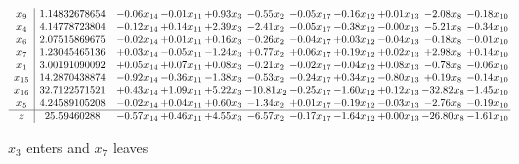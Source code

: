 \documentclass[9pt]{article}
\begin{document}
 \[\begin{array}{c| c c@{\hskip 2pt} c@{\hskip 2pt} c@{\hskip 2pt} c@{\hskip 2pt} c@{\hskip 2pt} c@{\hskip 2pt} c@{\hskip 2pt} c@{\hskip 2pt} c@{\hskip 2pt} }
 x_{9}   &  1.14832678654 & -0.06 x_{14} & -0.01 x_{11} & +  0.93 x_{3} & -0.55 x_{2} & -0.05 x_{17} & -0.16 x_{12} & +  0.01 x_{13} & -2.08 x_{8} & -0.18 x_{10}\\
 x_{4}   &  4.14778723804 & -0.12 x_{14} & +  0.14 x_{11} & +  2.39 x_{3} & -2.41 x_{2} & -0.05 x_{17} & -0.38 x_{12} & -0.00 x_{13} & -5.21 x_{8} & -0.34 x_{10}\\
 x_{6}   &  2.07515869675 & -0.02 x_{14} & +  0.01 x_{11} & +  0.16 x_{3} & -0.26 x_{2} & -0.04 x_{17} & +  0.03 x_{12} & -0.04 x_{13} & -0.18 x_{8} & -0.01 x_{10}\\
 x_{7}   &  1.23045465136 & +  0.03 x_{14} & -0.05 x_{11} & -1.24 x_{3} & +  0.77 x_{2} & +  0.06 x_{17} & +  0.19 x_{12} & +  0.02 x_{13} & +  2.98 x_{8} & +  0.14 x_{10}\\
 x_{1}   &  3.00191090092 & +  0.05 x_{14} & +  0.07 x_{11} & +  0.08 x_{3} & -0.21 x_{2} & -0.02 x_{17} & -0.04 x_{12} & +  0.08 x_{13} & -0.78 x_{8} & -0.06 x_{10}\\
 x_{15}   &  14.2870438874 & -0.92 x_{14} & -0.36 x_{11} & -1.38 x_{3} & -0.53 x_{2} & -0.24 x_{17} & +  0.34 x_{12} & -0.80 x_{13} & +  0.19 x_{8} & -0.14 x_{10}\\
 x_{16}   &  32.7122571521 & +  0.43 x_{14} & +  1.09 x_{11} & +  5.22 x_{3} & -10.81 x_{2} & -0.25 x_{17} & -1.60 x_{12} & +  0.12 x_{13} & -32.82 x_{8} & -1.45 x_{10}\\
 x_{5}   &  4.24589105208 & -0.02 x_{14} & +  0.04 x_{11} & +  0.60 x_{3} & -1.34 x_{2} & +  0.01 x_{17} & -0.19 x_{12} & -0.03 x_{13} & -2.76 x_{8} & -0.19 x_{10}\\
\hline
z    &  25.59460288 & -0.57 x_{14} & +  0.46 x_{11} & +  4.55 x_{3} & -6.57 x_{2} & -0.17 x_{17} & -1.64 x_{12} & +  0.00 x_{13} & -26.80 x_{8} & -1.61 x_{10}\\
\end{array}\]


 $ x_{3} $ enters and $ x_{7} $ leaves 
\end{document}
